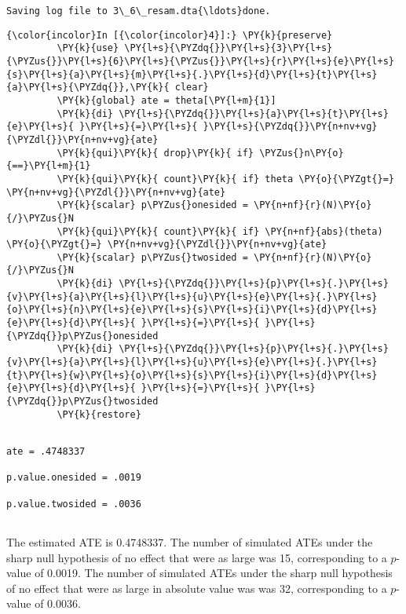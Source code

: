\documentclass[11pt,notitlepage]{article}\usepackage[]{graphicx}\usepackage[]{color}
\makeatletter
\newenvironment{kframe}{%
 \def\at@end@of@kframe{}%
 \ifinner\ifhmode%
  \def\at@end@of@kframe{\end{minipage}}%
  \begin{minipage}{\columnwidth}%
 \fi\fi%
 \def\FrameCommand##1{\hskip\@totalleftmargin \hskip-\fboxsep
 \colorbox{shadecolor}{##1}\hskip-\fboxsep
     \hskip-\linewidth \hskip-\@totalleftmargin \hskip\columnwidth}%
 \MakeFramed {\advance\hsize-\width
   \@totalleftmargin\z@ \linewidth\hsize
   \@setminipage}}%
 {\par\unskip\endMakeFramed%
 \at@end@of@kframe}
\newenvironment{knitrout}{}{} %
\makeatother
\begin{document}
\begin{knitrout}
\begin{kframe}
\begin{Verbatim}[commandchars=\\\{\}]
Saving log file to 3\_6\_resam.dta{\ldots}done.

    \end{Verbatim}

    \begin{Verbatim}[commandchars=\\\{\}]
{\color{incolor}In [{\color{incolor}4}]:} \PY{k}{preserve} 
         \PY{k}{use} \PY{l+s}{\PYZdq{}}\PY{l+s}{3}\PY{l+s}{\PYZus{}}\PY{l+s}{6}\PY{l+s}{\PYZus{}}\PY{l+s}{r}\PY{l+s}{e}\PY{l+s}{s}\PY{l+s}{a}\PY{l+s}{m}\PY{l+s}{.}\PY{l+s}{d}\PY{l+s}{t}\PY{l+s}{a}\PY{l+s}{\PYZdq{}},\PY{k}{ clear}
         \PY{k}{global} ate = theta[\PY{l+m}{1}]
         \PY{k}{di} \PY{l+s}{\PYZdq{}}\PY{l+s}{a}\PY{l+s}{t}\PY{l+s}{e}\PY{l+s}{ }\PY{l+s}{=}\PY{l+s}{ }\PY{l+s}{\PYZdq{}}\PY{n+nv+vg}{\PYZdl{}}\PY{n+nv+vg}{ate}
         \PY{k}{qui}\PY{k}{ drop}\PY{k}{ if} \PYZus{}n\PY{o}{==}\PY{l+m}{1}
         \PY{k}{qui}\PY{k}{ count}\PY{k}{ if} theta \PY{o}{\PYZgt{}=} \PY{n+nv+vg}{\PYZdl{}}\PY{n+nv+vg}{ate}
         \PY{k}{scalar} p\PYZus{}onesided = \PY{n+nf}{r}(N)\PY{o}{/}\PYZus{}N
         \PY{k}{qui}\PY{k}{ count}\PY{k}{ if} \PY{n+nf}{abs}(theta) \PY{o}{\PYZgt{}=} \PY{n+nv+vg}{\PYZdl{}}\PY{n+nv+vg}{ate}
         \PY{k}{scalar} p\PYZus{}twosided = \PY{n+nf}{r}(N)\PY{o}{/}\PYZus{}N
         \PY{k}{di} \PY{l+s}{\PYZdq{}}\PY{l+s}{p}\PY{l+s}{.}\PY{l+s}{v}\PY{l+s}{a}\PY{l+s}{l}\PY{l+s}{u}\PY{l+s}{e}\PY{l+s}{.}\PY{l+s}{o}\PY{l+s}{n}\PY{l+s}{e}\PY{l+s}{s}\PY{l+s}{i}\PY{l+s}{d}\PY{l+s}{e}\PY{l+s}{d}\PY{l+s}{ }\PY{l+s}{=}\PY{l+s}{ }\PY{l+s}{\PYZdq{}}p\PYZus{}onesided
         \PY{k}{di} \PY{l+s}{\PYZdq{}}\PY{l+s}{p}\PY{l+s}{.}\PY{l+s}{v}\PY{l+s}{a}\PY{l+s}{l}\PY{l+s}{u}\PY{l+s}{e}\PY{l+s}{.}\PY{l+s}{t}\PY{l+s}{w}\PY{l+s}{o}\PY{l+s}{s}\PY{l+s}{i}\PY{l+s}{d}\PY{l+s}{e}\PY{l+s}{d}\PY{l+s}{ }\PY{l+s}{=}\PY{l+s}{ }\PY{l+s}{\PYZdq{}}p\PYZus{}twosided 
         \PY{k}{restore}
\end{Verbatim}

    \begin{Verbatim}[commandchars=\\\{\}]

ate = .4748337

p.value.onesided = .0019

p.value.twosided = .0036


    \end{Verbatim}

\end{kframe}
\end{knitrout}

The estimated ATE is 0.4748337.  The number of simulated ATEs under the sharp null hypothesis of no effect that were as large was 15, corresponding to a $p$-value of 0.0019.  The number of simulated ATEs under the sharp null hypothesis of no effect that were as large in absolute value was  was 32, corresponding to a $p$-value of 0.0036.
\end{document}
